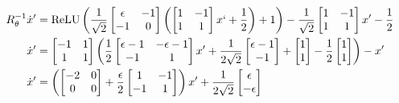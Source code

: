 \documentclass{article} %
\theoremstyle{definition}
\theoremstyle{remark}
\begin{document}
\begin{align}
R_{\theta}^{-1}\dot x' &= \operatorname{ReLU}\left(\frac{1}{\sqrt{2}}\begin{bmatrix}\epsilon &-1\\-1&0\end{bmatrix}\left(\begin{bmatrix}1 &-1\\1&1\end{bmatrix} x`+\frac{1}{2}\right)+1\right)-\frac{1}{\sqrt{2}}\begin{bmatrix}1 &-1\\1&1\end{bmatrix} x'-\frac{1}{2}\\
\dot x' &=\begin{bmatrix}-1 &1\\1&1\end{bmatrix}\left(\frac{1}{2}\begin{bmatrix}\epsilon-1 &-\epsilon-1\\-1&1\end{bmatrix}x' + \frac{1}{2\sqrt{2}}\begin{bmatrix}\epsilon-1 \\-1\end{bmatrix}+\begin{bmatrix}1 \\1\end{bmatrix}-\frac{1}{2}\begin{bmatrix}1 \\1\end{bmatrix}\right)-x'\\
\dot x' &=\left(\begin{bmatrix}-2 &0\\0&0\end{bmatrix}+\frac{\epsilon}{2}\begin{bmatrix}1 &-1\\-1&1\end{bmatrix}\right)x' + \frac{1}{2\sqrt{2}}\begin{bmatrix}\epsilon \\-\epsilon\end{bmatrix}
\end{align}
\end{document}
